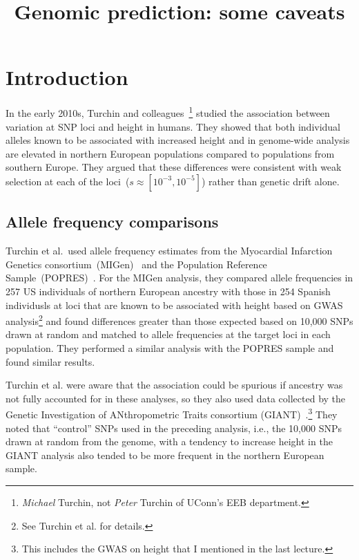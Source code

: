 \documentclass[12pt]{article}
\title{Genomic prediction: some caveats}\index{genomic prediction!caveats}
\begin{document}
\maketitle

\thispagestyle{first}

\section*{Introduction}

In the early 2010s, Turchin and
colleagues~\cite{Turchin-etal-2012}\footnote{{\it Michael\/} Turchin,
  not {\it Peter\/} Turchin of UConn's EEB department.} studied the
association between variation at SNP loci and height in humans. They
showed that both individual alleles known to be associated with
increased height and in genome-wide analysis are elevated in northern
European populations compared to populations from southern
Europe. They argued that these differences were consistent with weak
selection at each of the loci~($s \approx [10^{-3}, 10^{-5}]$) rather
than genetic drift alone.

\subsection*{Allele frequency comparisons}

Turchin et al.\ used allele frequency estimates from the Myocardial
Infarction Genetics consortium~(MIGen)~\cite{MIGen-2009} and the
Population Reference Sample~(POPRES)~\cite{Nelson-etal-2008}. For the MIGen
analysis, they compared allele frequencies in 257 US individuals of
northern European ancestry with those in 254 Spanish individusls at
loci that are known to be associated with height based on GWAS
analysis\footnote{See Turchin et al. for details.} and found
differences greater than those expected based on 10,000 SNPs drawn at
random and matched to allele frequencies at the target loci in each
population. They performed a similar analysis with the POPRES sample
and found similar results.

Turchin et al. were aware that the association could be spurious if
ancestry was not fully accounted for in these analyses, so they also
used data collected by the Genetic Investigation of ANthropometric
Traits consortium (GIANT)~\cite{LangoAllen-etal-2010}.\footnote{This
  includes the GWAS on height that I mentioned in the last lecture.}
They noted that ``control'' SNPs used in the preceding analysis,
i.e., the 10,000 SNPs drawn at random from the genome, with a tendency
to increase height in the GIANT analysis also tended to be more
frequent in the northern European sample.
\end{document}
